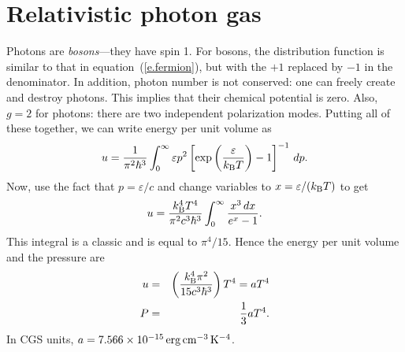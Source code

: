 \section{Relativistic photon gas}
Photons are \emph{bosons}---they have spin 1. For bosons, the distribution function is similar to that in equation~(\ref{e.fermion}), but with the $+1$ replaced by $-1$ in the denominator. In addition, photon number is not conserved: one can freely create and destroy photons.  This implies that their chemical potential is zero.  Also, $g=2$ for photons: there are two independent polarization modes. Putting all of these together, we can write energy per unit volume as
\begin{equation}\label{e.boson-dist}
u = \frac{1}{\pi^{2}\hbar^{3}}\int_{0}^{\infty}\varepsilon p^{2}\left[\exp\left(\frac{\varepsilon}{k_\mathrm{B} T}\right)-1\right]^{-1}\,dp.
\end{equation}
Now, use the fact that $p = \varepsilon/c$ and change variables to $x = \varepsilon/(k_\mathrm{B} T)$ to get
\[
 u = \frac{k_\mathrm{B} ^{4}T^{4}}{\pi^{2}c^{3}\hbar^{3}}\int_{0}^{\infty} \frac{x^{3}\,dx}{e^{x}-1}.
\]
This integral is a classic and is equal to $\pi^{4}/15$.  Hence the energy per unit volume and the pressure are
\begin{eqnarray}\label{e.radiation-eos}
u &=& \left(\frac{k_\mathrm{B} ^{4}\pi^{2}}{15 c^{3}\hbar^{3}} \right) T^{4} = aT^{4}\\
P &=& \frac{1}{3} aT^{4}.
\end{eqnarray}
In CGS units, $a = 7.566\times 10^{-15}\,\mathrm{erg}\,\mathrm{c}\mathrm{m}^{-3}\,\mathrm{K}^{-4}$.

